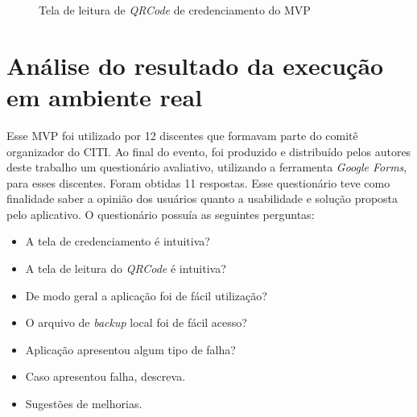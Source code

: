 \begin{figure}[H]
    \centering
    \caption{Tela de leitura de \textit{QRCode} de credenciamento do MVP}
    \label{fig:mvp2}
\end{figure}

\section{Análise do resultado da execução em ambiente real}

Esse MVP foi utilizado por 12 discentes que formavam parte do comitê organizador do CITI. Ao final do evento, foi produzido e distribuído pelos autores deste trabalho um questionário avaliativo, utilizando a ferramenta \textit{Google Forms}, para esses discentes. Foram obtidas 11 respostas. Esse questionário teve como finalidade saber a opinião dos usuários quanto a usabilidade e solução proposta pelo aplicativo. O questionário possuía as seguintes perguntas:

\begin{itemize}
    \item A tela de credenciamento é intuitiva?
    \item A tela de leitura do \textit{QRCode} é intuitiva?
    \item De modo geral a aplicação foi de fácil utilização?
    \item O arquivo de \textit{backup} local foi de fácil acesso?
    \item Aplicação apresentou algum tipo de falha?
    \item Caso apresentou falha, descreva.
    \item Sugestões de melhorias.
\end{itemize}

